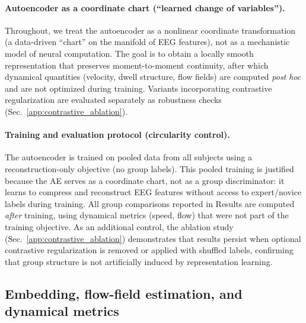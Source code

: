 \documentclass[5p,twocolumn,authoryear]{elsarticle}
\newcommand{\secref}[1]{Sec.~\ref{#1}}
\begin{document}
\paragraph{Autoencoder as a coordinate chart (``learned change of variables'').}
Throughout, we treat the autoencoder as a nonlinear coordinate transformation (a data-driven ``chart'' on the manifold of EEG features), not as a mechanistic model of neural computation. The goal is to obtain a locally smooth representation that preserves moment-to-moment continuity, after which dynamical quantities (velocity, dwell structure, flow fields) are computed \emph{post hoc} and are not optimized during training. Variants incorporating contrastive regularization are evaluated separately as robustness checks (\secref{app:contrastive_ablation}).

\paragraph{Training and evaluation protocol (circularity control).}
The autoencoder is trained on pooled data from all subjects using a reconstruction-only objective (no group labels). This pooled training is justified because the AE serves as a coordinate chart, not as a group discriminator: it learns to compress and reconstruct EEG features without access to expert/novice labels during training. All group comparisons reported in Results are computed \emph{after} training, using dynamical metrics (speed, flow) that were not part of the training objective. As an additional control, the ablation study (\secref{app:contrastive_ablation}) demonstrates that results persist when optional contrastive regularization is removed or applied with shuffled labels, confirming that group structure is not artificially induced by representation learning.

\subsection{Embedding, flow-field estimation, and dynamical metrics}
\end{document}
